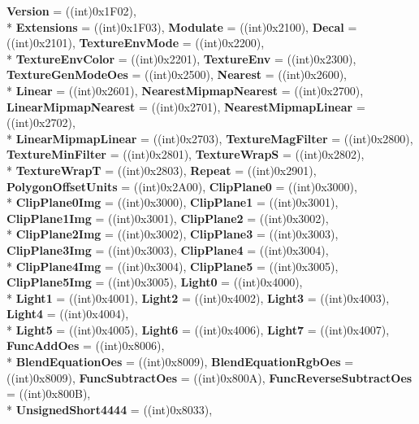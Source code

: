\begin{DoxyCompactItemize}
{\bfseries Version} = ((int)0x1\-F02), 
\\*
{\bfseries Extensions} = ((int)0x1\-F03), 
{\bfseries Modulate} = ((int)0x2100), 
{\bfseries Decal} = ((int)0x2101), 
{\bfseries Texture\-Env\-Mode} = ((int)0x2200), 
\\*
{\bfseries Texture\-Env\-Color} = ((int)0x2201), 
{\bfseries Texture\-Env} = ((int)0x2300), 
{\bfseries Texture\-Gen\-Mode\-Oes} = ((int)0x2500), 
{\bfseries Nearest} = ((int)0x2600), 
\\*
{\bfseries Linear} = ((int)0x2601), 
{\bfseries Nearest\-Mipmap\-Nearest} = ((int)0x2700), 
{\bfseries Linear\-Mipmap\-Nearest} = ((int)0x2701), 
{\bfseries Nearest\-Mipmap\-Linear} = ((int)0x2702), 
\\*
{\bfseries Linear\-Mipmap\-Linear} = ((int)0x2703), 
{\bfseries Texture\-Mag\-Filter} = ((int)0x2800), 
{\bfseries Texture\-Min\-Filter} = ((int)0x2801), 
{\bfseries Texture\-Wrap\-S} = ((int)0x2802), 
\\*
{\bfseries Texture\-Wrap\-T} = ((int)0x2803), 
{\bfseries Repeat} = ((int)0x2901), 
{\bfseries Polygon\-Offset\-Units} = ((int)0x2\-A00), 
{\bfseries Clip\-Plane0} = ((int)0x3000), 
\\*
{\bfseries Clip\-Plane0\-Img} = ((int)0x3000), 
{\bfseries Clip\-Plane1} = ((int)0x3001), 
{\bfseries Clip\-Plane1\-Img} = ((int)0x3001), 
{\bfseries Clip\-Plane2} = ((int)0x3002), 
\\*
{\bfseries Clip\-Plane2\-Img} = ((int)0x3002), 
{\bfseries Clip\-Plane3} = ((int)0x3003), 
{\bfseries Clip\-Plane3\-Img} = ((int)0x3003), 
{\bfseries Clip\-Plane4} = ((int)0x3004), 
\\*
{\bfseries Clip\-Plane4\-Img} = ((int)0x3004), 
{\bfseries Clip\-Plane5} = ((int)0x3005), 
{\bfseries Clip\-Plane5\-Img} = ((int)0x3005), 
{\bfseries Light0} = ((int)0x4000), 
\\*
{\bfseries Light1} = ((int)0x4001), 
{\bfseries Light2} = ((int)0x4002), 
{\bfseries Light3} = ((int)0x4003), 
{\bfseries Light4} = ((int)0x4004), 
\\*
{\bfseries Light5} = ((int)0x4005), 
{\bfseries Light6} = ((int)0x4006), 
{\bfseries Light7} = ((int)0x4007), 
{\bfseries Func\-Add\-Oes} = ((int)0x8006), 
\\*
{\bfseries Blend\-Equation\-Oes} = ((int)0x8009), 
{\bfseries Blend\-Equation\-Rgb\-Oes} = ((int)0x8009), 
{\bfseries Func\-Subtract\-Oes} = ((int)0x800\-A), 
{\bfseries Func\-Reverse\-Subtract\-Oes} = ((int)0x800\-B), 
\\*
{\bfseries Unsigned\-Short4444} = ((int)0x8033), 

\end{DoxyCompactItemize}
